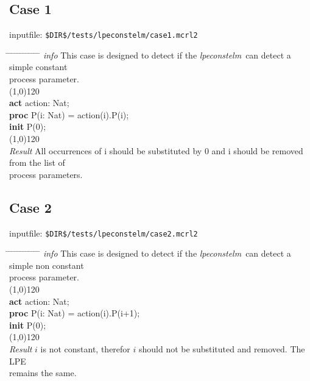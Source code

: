 \index{}\documentclass[a4paper,10pt]{article}
\theoremstyle{plain}
\theoremstyle{definition}
\newcommand{\tool}{\textit{lpeconstelm}}
\newcommand{\pp}{process parameter}
\newcommand{\pps}{process parameters}
\newcommand{\ti}{\textit}
\newcommand{\tb}{\textbf}
\newcommand{\tabw}{\hspace*{15.mm} \= \hspace*{20.mm} \= \hspace*{5.mm} \= \hspace*{5.mm} \= \hspace*{5.mm} \= \hspace*{5.mm}  \= \hspace*{5.mm}  \= \hspace*{5.mm}  \= \hspace*{5.mm} \= \hspace*{5.mm} \= \hspace*{5.mm}  \= \hspace*{5.mm}  \= \hspace*{5.mm}\kill}
\begin{document}
\subsection*{Case 1}
inputfile: \verb"$DIR$/tests/lpeconstelm/case1.mcrl2"
\begin{tabbing}
\tabw
\ti{info} \> This case is designed to detect if the \tool\ can detect a simple constant \\
\> \pp .\\
\line(1,0){120}\\

\tb{act}  \> action: Nat;\\
\tb{proc} \> P(i: Nat) \> = \> action(i).P(i);\\
\tb{init} \> P(0);\\

\line(1,0){120}\\
\ti{Result} 
\> All occurrences of i should be substituted by 0 and i should be removed from the list of \\
\> \pps . \\ 
\end{tabbing}

\subsection*{Case 2}
inputfile: \verb"$DIR$/tests/lpeconstelm/case2.mcrl2"
\begin{tabbing}
\tabw
\ti{info} 
\> This case is designed to detect if the \tool\ can detect a simple non constant \\
\> \pp .\\
\line(1,0){120}\\
\tb{act}  \> action: Nat;\\
\tb{proc} \> P(i: Nat) \> = \> action(i).P(i+1);\\
\tb{init} \> P(0);\\
\line(1,0){120}\\
\ti{Result} \> $i$ is not constant, therefor $i$ should not be substituted and removed. The LPE \\
\> remains the same. \\ 
\end{tabbing}
\end{document}
